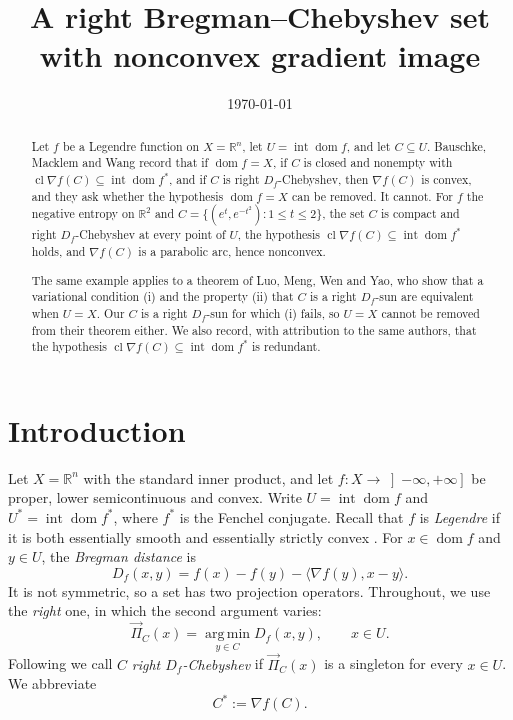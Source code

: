 \documentclass[11pt]{amsart}
\title[A right Bregman--Chebyshev set with nonconvex gradient image]
{A right Bregman--Chebyshev set\\ with nonconvex gradient image}
\author{}
\date{\today}
\theoremstyle{plain}
\theoremstyle{definition}
\theoremstyle{remark}
\newcommand{\R}{\mathbb{R}}
\newcommand{\dom}{\operatorname{dom}}
\newcommand{\intr}{\operatorname{int}}
\newcommand{\cl}{\operatorname{cl}}
\newcommand{\D}{D_f}
\newcommand{\Proj}{\overrightarrow{\Pi}}
\newcommand{\Cstar}{C^{*}}
\newcommand{\ip}[2]{\langle #1, #2 \rangle}
\begin{document}
\begin{abstract}
Let $f$ be a Legendre function on $X = \R^{n}$, let $U = \intr \dom f$, and let
$C \subseteq U$. Bauschke, Macklem and Wang record that if $\dom f = X$, if $C$
is closed and nonempty with $\cl \nabla f(C) \subseteq \intr \dom f^{*}$, and if
$C$ is right $\D$-Chebyshev, then $\nabla f(C)$ is convex, and they ask whether
the hypothesis $\dom f = X$ can be removed. It cannot. For $f$ the negative
entropy on $\R^{2}$ and $C = \{ (e^{t}, e^{-t^{2}}) : 1 \le t \le 2 \}$, the set
$C$ is compact and right $\D$-Chebyshev at every point of $U$, the hypothesis
$\cl \nabla f(C) \subseteq \intr \dom f^{*}$ holds, and $\nabla f(C)$ is a
parabolic arc, hence nonconvex.

The same example applies to a theorem of Luo, Meng, Wen and Yao, who show that
a variational condition (i) and the property (ii) that $C$ is a right $\D$-sun
are equivalent when $U = X$. Our $C$ is a right $\D$-sun for which (i) fails, so
$U = X$ cannot be removed from their theorem either. We also record, with
attribution to the same authors, that the hypothesis
$\cl \nabla f(C) \subseteq \intr \dom f^{*}$ is redundant.
\end{abstract}

\maketitle

\section{Introduction}

Let $X = \R^{n}$ with the standard inner product, and let
$f \colon X \to \left]-\infty, +\infty\right]$ be proper, lower semicontinuous
and convex. Write $U = \intr \dom f$ and $U^{*} = \intr \dom f^{*}$, where
$f^{*}$ is the Fenchel conjugate. Recall that $f$ is \emph{Legendre} if it is
both essentially smooth and essentially strictly convex \cite{BBC2001,Rock1970}.
For $x \in \dom f$ and $y \in U$, the \emph{Bregman distance} is
\[
  \D(x,y) = f(x) - f(y) - \ip{\nabla f(y)}{x - y}.
\]
It is not symmetric, so a set has two projection operators. Throughout, we use
the \emph{right} one, in which the second argument varies:
\[
  \Proj_{C}(x) = \operatorname*{arg\,min}_{y \in C} \D(x,y),
  \qquad x \in U .
\]
Following \cite{BMW2010} we call $C$ \emph{right $\D$-Chebyshev} if
$\Proj_{C}(x)$ is a singleton for every $x \in U$. We abbreviate
\[
  \Cstar := \nabla f(C).
\]
\end{document}
